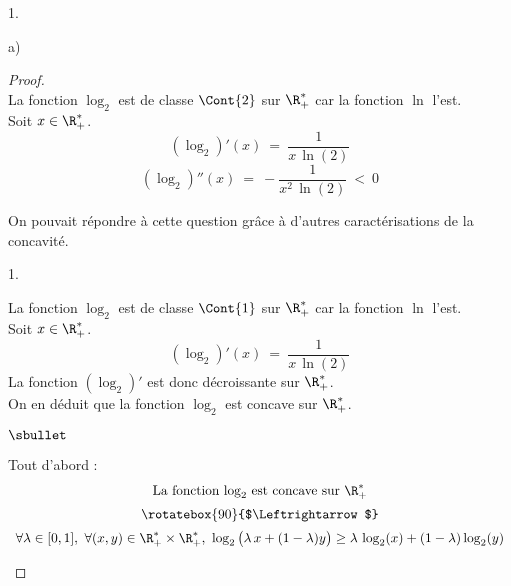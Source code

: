 \documentclass[11pt]{article}%
\begin{document}
\begin{noliste}{1.}
\begin{noliste}{a)}
    \begin{proof}~\\
      La fonction $\log_2$ est de classe $\Cont{2}$ sur
      $\R_+^*$ car la fonction $\ln$ l'est.\\
      Soit $x \in \R_+^*$.
      \[
        (\log_2)'(x) \ = \ \dfrac{1}{x \, \ln(2)}
      \]
      \[
        (\log_2)''(x) \ = \ -\dfrac{1}{x^2 \, \ln(2)} \ < \ 0
      \]
      \begin{remarkL}{.95}
        On pouvait répondre à cette question grâce à d'autres
        caractérisations de la concavité.
        \begin{noliste}{\scriptsize 1.}
        \item La fonction $\log_2$ est de classe $\Cont{1}$ sur
          $\R_+^*$ car la fonction $\ln$ l'est.\\
          Soit $x \in \R_+^*$.
          \[
            (\log_2)'(x) \ = \ \dfrac{1}{x \, \ln(2)}
          \]
          La fonction $(\log_2)'$ est donc décroissante sur $\R_+^*$.\\
          On en déduit que la fonction $\log_2$ est concave sur
          $\R_+^*$.
          
        \item
          \begin{noliste}{$\sbullet$}
          \item Tout d'abord :
            \[
              \begin{array}{c}
                \text{La fonction $\log_2$ est concave sur $\R_+^*$}
                \\[.2cm]
                \rotatebox{90}{$\Leftrightarrow$}
                \\[.2cm]
                \forall \lambda \in [0,1], \ \forall (x,y)
                \in \R_+^* \times \R_+^*, \ \log_2\big(\lambda \, x + (1-
                \lambda) y\big) \geq \lambda \, \log_2(x) + (1- \lambda)
                \log_2(y)
              \end{array}
            \]
            

\end{noliste}
\end{noliste}
\end{remarkL}
\end{proof}
\end{noliste}
\end{noliste}
\end{document}
